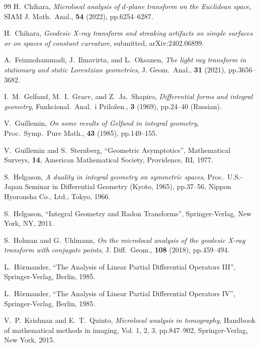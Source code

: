 \documentclass[a4paper,11pt,reqno]{amsart}
\theoremstyle{definition}
\theoremstyle{remark}
\begin{document}
%
%
%
%
%
%
\begin{thebibliography}{99}
H.~Chihara, 
{\it Microlocal analysis of $d$-plane transform on the Euclidean space}, 
SIAM J. Math.\ Anal., {\bf 54} (2022), pp.6254--6287.

H.~Chihara, 
{\it Geodesic X-ray transform and streaking artifacts on simple surfaces or on spaces of constant curvature}, 
submitted, arXiv:2402.06899.

A.~Feizmohammadi, J.~Ilmavirta, and L.~Oksanen, 
{\it The light ray transform in stationary and static Lorentzian geometries}, 
J. Geom.\ Anal., {\bf 31} (2021), pp.3656--3682. 

I.~M.~Gelfand, M.~I.~Graev, and Z.~Ja.~Shapiro, 
{\it Differential forms and integral geometry}, 
Funkcional.\ Anal.\ i Priložen., {\bf 3} (1969), pp.24--40 (Russian).

V.~Guillemin, 
{\it On some results of Gelfand in integral geometry}, 
Proc.\ Symp.\ Pure Math., {\bf 43} (1985), pp.149--155.

V.~Guillemin and S.~Sternberg, 
``Geometric Asymptotics'', 
Mathematical Surveys, {\bf 14}, 
American Mathematical Society, 
Providence, RI, 1977. 

S.~Helgason, 
{\it A duality in integral geometry on symmetric spaces}, 
Proc.\ U.S.-Japan Seminar in Differential Geometry (Kyoto, 1965), pp.37--56, 
Nippon Hyoronsha Co., Ltd., Tokyo, 1966. 

S.~Helgason, 
``Integral Geometry and Radon Transforms'', 
Springer-Verlag, New York, NY, 2011.

S.~Holman and G.~Uhlmann, 
{\it On the microlocal analysis of the geodesic X-ray transform with conjugate points}, 
J. Diff.\ Geom., {\bf 108} (2018), pp.459--494.

L.~H\"ormander, 
``The Analysis of Linear Partial Differential Operators III'', 
Springer-Verlag, Berlin, 1985. 

L.~H\"ormander, 
``The Analysis of Linear Partial Differential Operators IV'', 
Springer-Verlag, Berlin, 1985. 

V.~P.~Krishnan and E.~T.~Quinto, 
{\it Microlocal analysis in tomography}, 
Handbook of mathematical methods in imaging, 
Vol. 1, 2, 3, pp.847--902, Springer-Verlag, New York, 2015.


\end{thebibliography}
\end{document}
